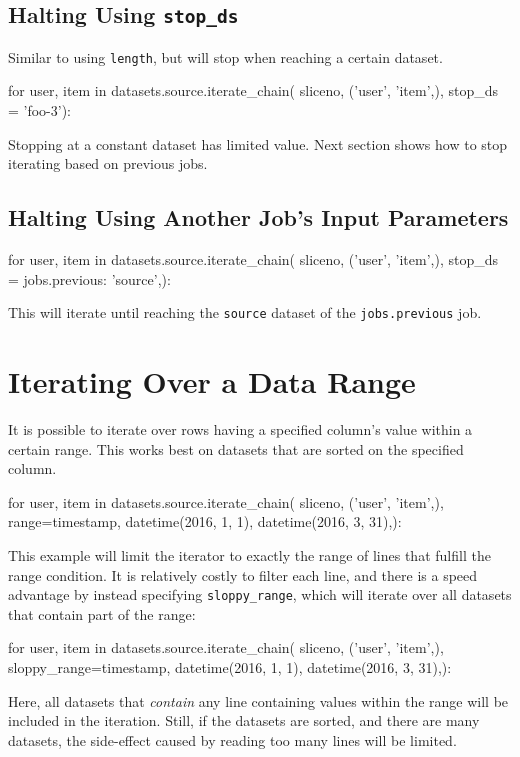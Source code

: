\subsection{Halting Using \texttt{stop\_ds}}
Similar to using \texttt{length}, but will stop when reaching a
certain dataset.
\begin{python}
for user, item in datasets.source.iterate_chain(
                       sliceno, ('user', 'item',),
                       stop_ds = 'foo-3'):
\end{python}
Stopping at a constant dataset has limited value.  Next section shows
how to stop iterating based on previous jobs.



\subsection{Halting Using Another Job's Input Parameters}
\begin{python}
for user, item in datasets.source.iterate_chain(
                       sliceno, ('user', 'item',),
                       stop_ds = {jobs.previous: 'source',}):
\end{python}
This will iterate until reaching the \texttt{source} dataset of
the \texttt{jobs.previous} job.



\section{Iterating Over a Data Range}
\label{sec:iterate_sloppy_range}
It is possible to iterate over rows having a specified column's value
within a certain range.  This works best on datasets that are sorted
on the specified column.
\begin{python}
for user, item in datasets.source.iterate_chain(
           sliceno, ('user', 'item',),
           range={timestamp, datetime(2016, 1, 1), datetime(2016, 3, 31),}):
\end{python}
This example will limit the iterator to exactly the range of lines
that fulfill the range condition.  It is relatively costly to filter
each line, and there is a speed advantage by instead specifying
\texttt{sloppy\_range}, which will iterate over all datasets that
contain part of the range:
\begin{python}
for user, item in datasets.source.iterate_chain(
           sliceno, ('user', 'item',),
           sloppy_range={timestamp,
                         datetime(2016, 1, 1),
                         datetime(2016, 3, 31),}):
\end{python}
Here, all datasets that \textsl{contain} any line containing values
within the range will be included in the iteration.  Still, if the
datasets are sorted, and there are many datasets, the side-effect
caused by reading too many lines will be limited.



